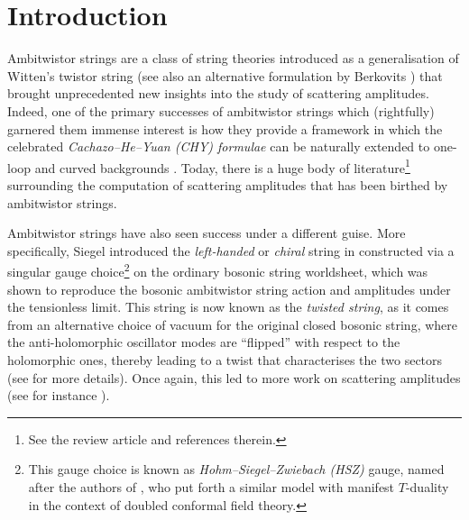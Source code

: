 \documentclass[11pt,reqno,a4paper,final]{amsart}
\theoremstyle{plain}
\theoremstyle{definition}
\newcommand{\1}{\mathbb{1}}
\numberwithin{equation}{section}
\begin{document}
\section{Introduction}
\label{sec:introduction}
Ambitwistor strings \cite{MasonSkinner, Adamo:2013tsa,
  Berkovits:2013xba} are a class of string theories introduced as a
generalisation of Witten's twistor string \cite{Witten:2003nn} (see
also an alternative formulation by Berkovits \cite{Berkovits:2004hg})
that brought unprecedented new insights into the study of scattering
amplitudes. Indeed, one of the primary successes of ambitwistor
strings which (rightfully) garnered them immense interest is how they
provide a framework in which the celebrated \emph{Cachazo--He--Yuan
  (CHY) formulae} \cite{Cachazo:2013gna, Cachazo:2013hca,
  Cachazo:2013iaa, Cachazo:2013iea} can be naturally extended to
one-loop \cite{Adamo:2013tsa, Adamo:2015hoa, Geyer:2015bja,
  Geyer:2015jch, Ohmori:2015sha} and curved backgrounds
\cite{Adamo:2014wea, Chandia:2015sfa, Chandia:2015xfa, Adamo:2017sze, Adamo:2018ege, Eberhardt:2020ewh, Roehrig:2020kck, Gomez:2021qfd, Adamo:2025bfr}.
Today, there is a huge body of literature\footnote{See the review
  article \cite{Geyer:2022cey} and references therein.} surrounding
the computation of scattering amplitudes that has been birthed by
ambitwistor strings.

Ambitwistor strings have also seen success under a different guise.
More specifically, Siegel introduced the \emph{left-handed} or
\emph{chiral} string in \cite{Siegel:2015axg} constructed via a
singular gauge choice\footnote{This gauge choice is known as
  \emph{Hohm--Siegel--Zwiebach (HSZ)} gauge, named after the authors
  of \cite{Hohm:2013jaa}, who put forth a similar model with manifest
  $T$-duality in the context of doubled conformal field theory.} on
the ordinary bosonic string worldsheet, which was shown to reproduce
the bosonic ambitwistor string action and amplitudes under the
tensionless limit. This string is now known as the \emph{twisted
  string}, as it comes from an alternative choice of vacuum for the
original closed bosonic string, where the anti-holomorphic oscillator
modes are ``flipped'' with respect to the holomorphic ones, thereby
leading to a twist that characterises the two sectors (see
\cite{Lee:2017utr} for more details). Once again, this led to more
work on scattering amplitudes (see for instance \cite{Siegel:2015axg,
  Huang:2016bdd, Leite:2016fno, Casali:2017mss}).
\end{document}
